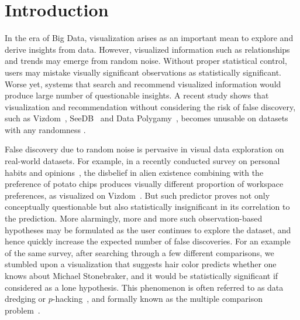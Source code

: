 \section{Introduction}
\label{sec:intro}
 In the era of Big Data, visualization arises as an important mean to explore and derive insights from data.  However, visualized information such as relationships and trends may emerge from random noise.  Without proper statistical control, users may mistake visually significant observations as statistically significant.  Worse yet, systems that search and recommend visualized information would produce large number of questionable insights.  
A recent study shows that visualization and recommendation without considering the risk of false discovery, such as Vizdom~\cite{vizdom}, SeeDB~\cite{seedb} and Data Polygamy~\cite{polygamy}, becomes unusable on datasets with any randomness \cite{towards-sustainable-insight}.

 False discovery due to random noise is pervasive in visual data exploration on real-world datasets. For example, in a recently conducted survey on personal habits and opinions~\cite{towards-sustainable-insight}, the disbelief in alien existence combining with the preference of potato chips produces visually different proportion of workspace preferences, as visualized on Vizdom~\cite{vizdom}.  But such predictor proves not only conceptually questionable but also statistically insignificant in its correlation to the prediction.  More alarmingly, more and more such observation-based hypotheses may be formulated as the user continues to explore the dataset, and hence quickly increase the expected number of false discoveries. For an example of the same survey, after searching through a few different comparisons, we stumbled upon a visualization that suggests hair color predicts whether one knows about Michael Stonebraker, and it would be statistically significant if considered as a lone hypothesis. This phenomenon is often referred to as data dredging or $p$-hacking~\cite{p-hacking}, and formally known as the multiple comparison problem~\cite{shaffer1995multiple}.

